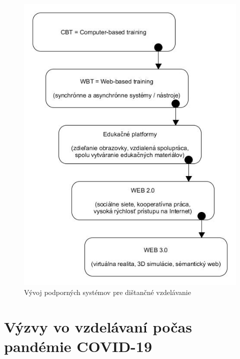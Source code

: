 \documentclass[10pt,oneside,slovak,a4paper]{article}
\begin{document}
\begin{figure}[h]
	\centering
	\includegraphics[width=\textwidth]{Dev_Of_SupSys_DE.jpg}
	\caption{Vývoj podporných systémov pre dištančné vzdelávanie\cite{WiktorzakKotowski}}
	\label{Vyvoj_podp_sys_DE}
\end{figure}

\section{Výzvy vo vzdelávaní počas pandémie COVID-19}
\end{document}
